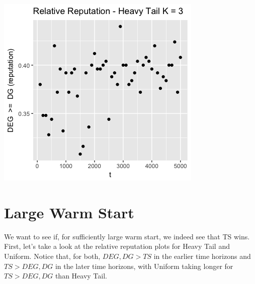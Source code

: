 \documentclass[11pt,letterpaper]{article}
\begin{document}
\includegraphics[scale=0.5]{deg_dg_ht_3_prelim}

\section*{Large Warm Start}

We want to see if, for sufficiently large warm start, we indeed see that TS wins. First, let's take a look at the relative reputation plots for Heavy Tail and Uniform. Notice that, for both, $DEG, DG > TS$ in the earlier time horizons and $TS > DEG, DG$ in the later time horizons, with Uniform taking longer for $TS > DEG, DG$ than Heavy Tail. \\
\end{document}
